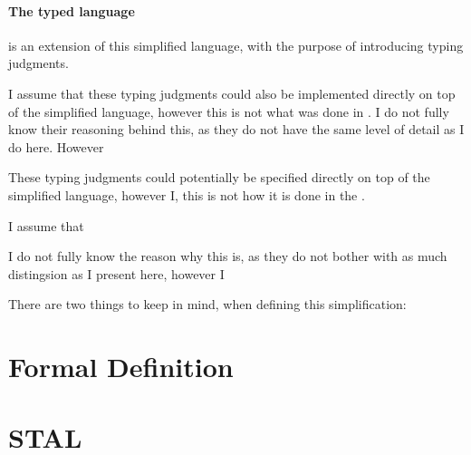 \paragraph{The typed language} is an extension of this simplified language, with
the purpose of introducing typing judgments.

I assume that these typing judgments could also be implemented directly on top
of the simplified language, however this is not what was done in \cite{STAL}. I
do not fully know their reasoning behind this, as they do not have the same
level of detail as I do here. However

These typing judgments could
potentially be specified directly on top of the simplified language, however I, this is not
how it is done in the \cite{STAL}.

I assume that

I do not fully know the reason why this is, as they do not bother with as much distingsion as I present here, however I

There are two things to keep in mind, when defining this simplification:






\section{Formal Definition}

\section{STAL}



